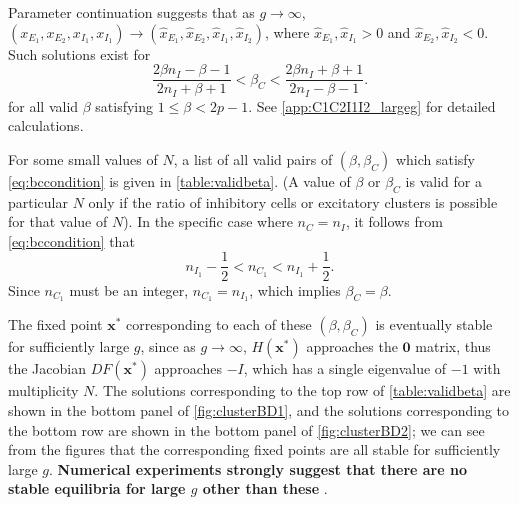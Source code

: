 \documentclass[reqno]{siamonline190516}
\newcommand{\xvec}{\mathbf{x}}
\newcommand{\Zerovec}{\mathbf{0}}
\newcommand{\revised}[1]{ \textbf{#1} }
\begin{document}
Parameter continuation suggests that as $g \rightarrow \infty$, $(x_{E_1}, x_{E_2}, x_{I_1}, x_{I_1}) \rightarrow (\hat{x}_{E_1}, \hat{x}_{E_2}, \hat{x}_{I_1}, \hat{x}_{I_2})$, where $\hat{x}_{E_1}, \hat{x}_{I_1} > 0$ and $\hat{x}_{E_2}, \hat{x}_{I_2} < 0$. Such solutions exist for 
\begin{equation}\label{eq:bccondition}
    \frac{2 \beta n_I - \beta - 1}{2 n_I + \beta + 1} < \beta_C < \frac{2 \beta n_I + \beta + 1}{2 n_I - \beta - 1}.
\end{equation}
for all valid $\beta$ satisfying $1 \leq \beta < 2p-1$. See \cref{app:C1C2I1I2_largeg} for detailed calculations.

For some small values of $N$, a list of all valid pairs of $(\beta, \beta_C)$ which satisfy \cref{eq:bccondition} is given in \cref{table:validbeta}. (A value of $\beta$ or $\beta_C$ is valid for a particular $N$ only if the ratio of inhibitory cells or excitatory clusters is possible for that value of $N$). In the specific case where $n_C = n_I$, it follows from \cref{eq:bccondition} that 
\[
n_{I_1} - \frac{1}{2} < n_{C_1} < n_{I_1} + \frac{1}{2}.
\]
Since $n_{C_1}$ must be an integer, $n_{C_1} = n_{I_1}$, which implies $\beta_C = \beta$.

The fixed point $\xvec^*$ corresponding to each of these $(\beta, \beta_C)$ is eventually stable for sufficiently large $g$, since as $g\rightarrow \infty$, $H(\xvec^*)$ approaches the $\Zerovec$ matrix, thus the Jacobian $DF(\xvec^*)$ approaches $-I$, which has a single eigenvalue of $-1$ with multiplicity $N$. The solutions corresponding to the top row of \cref{table:validbeta} are shown in the bottom panel of \cref{fig:clusterBD1}, and the solutions corresponding to the bottom row are shown in the bottom panel of \cref{fig:clusterBD2}; we can see from the figures that the corresponding fixed points are all stable for sufficiently large $g$. \revised{Numerical experiments strongly suggest that there are no stable equilibria for large $g$ other than these}.
\end{document}
